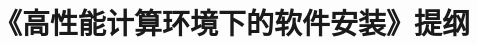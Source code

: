 \documentclass{article}      %
\begin{document}
\graphicspath{{Figures/}}
%
\renewcommand{\abstractname}{\small{\CJKfamily{hei} 摘\quad 要}} %
\renewcommand{\refname}{\centering\CJKfamily{hei} 参考文献}
\renewcommand{\figurename}{{\bf Fig}.}
\renewcommand{\tablename}{{\bf Tab}.}

\makeatletter
\long{}
\makeatother

\newcommand{\keywords}[1]{{\hspace{0\ccwd}\small{\CJKfamily{hei} 关键词:}{\hspace{2ex}{#1}}\bigskip}}



\title{《高性能计算环境下的软件安装》提纲}

\author{
\small
\small
}
\date{}					%
\maketitle
\end{document}
